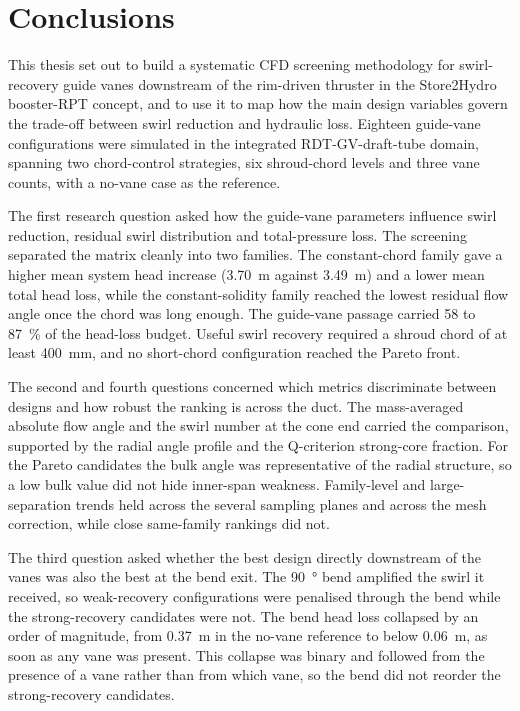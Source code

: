 \chapter{Conclusions}
\label{chap:conclusion}

This thesis set out to build a systematic CFD screening methodology for swirl-recovery guide vanes downstream of the rim-driven thruster in the Store2Hydro booster-RPT concept, and to use it to map how the main design variables govern the trade-off between swirl reduction and hydraulic loss. Eighteen guide-vane configurations were simulated in the integrated RDT-GV-draft-tube domain, spanning two chord-control strategies, six shroud-chord levels and three vane counts, with a no-vane case as the reference.

The first research question asked how the guide-vane parameters influence swirl reduction, residual swirl distribution and total-pressure loss. The screening separated the matrix cleanly into two families. The constant-chord family gave a higher mean system head increase (\SI{3.70}{\meter} against \SI{3.49}{\meter}) and a lower mean total head loss, while the constant-solidity family reached the lowest residual flow angle once the chord was long enough. The guide-vane passage carried 58 to \SI{87}{\percent} of the head-loss budget. Useful swirl recovery required a shroud chord of at least \SI{400}{\milli\meter}, and no short-chord configuration reached the Pareto front.

The second and fourth questions concerned which metrics discriminate between designs and how robust the ranking is across the duct. The mass-averaged absolute flow angle and the swirl number at the cone end carried the comparison, supported by the radial angle profile and the Q-criterion strong-core fraction. For the Pareto candidates the bulk angle was representative of the radial structure, so a low bulk value did not hide inner-span weakness. Family-level and large-separation trends held across the several sampling planes and across the mesh correction, while close same-family rankings did not.

The third question asked whether the best design directly downstream of the vanes was also the best at the bend exit. The \SI{90}{\degree} bend amplified the swirl it received, so weak-recovery configurations were penalised through the bend while the strong-recovery candidates were not. The bend head loss collapsed by an order of magnitude, from \SI{0.37}{\meter} in the no-vane reference to below \SI{0.06}{\meter}, as soon as any vane was present. This collapse was binary and followed from the presence of a vane rather than from which vane, so the bend did not reorder the strong-recovery candidates.

